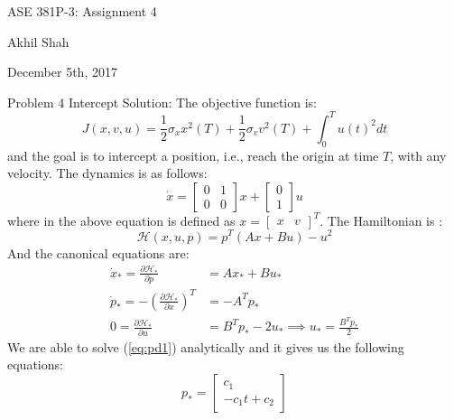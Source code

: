 \documentclass{article}
\begin{document}
\begin{center}
	{\huge ASE 381P-3: Assignment 4}
\end{center}
\begin{center}
	Akhil Shah
\end{center}
\begin{center}
	December 5th, 2017
\end{center}

\noindent
{\large Problem 4}
\newline
\newline
\noindent
Intercept Solution:
\newline
The objective function is:
\begin{equation*}
	J(x, v, u) = \frac{1}{2}\sigma_x x^2(T) + \frac{1}{2}\sigma_v v^2(T) + \int_0^T{u(t)^2 dt}
\end{equation*}
and the goal is to intercept a position, i.e., reach the origin at time $T$, with any velocity.  \newline
The dynamics is as follows:
\begin{equation*}
	\dot{x} = \begin{bmatrix} 0 & 1 \\ 0 & 0  \end{bmatrix} x + \begin{bmatrix} 0 \\ 1 \end{bmatrix}u 
\end{equation*}
where in the above equation is defined as $ x = \begin{bmatrix} x & v \end{bmatrix}^T $. \newline
The Hamiltonian is :
\begin{equation*}
	\mathcal{H}(x, u, p) = p^T(Ax + Bu) - u^2
\end{equation*}
And the canonical equations are:
\begin{align}
	\dot{x}_* = \frac{\partial \mathcal{H}_*}{\partial p} &= Ax_* + Bu_* \label{eq:dyn1} \\ 
	\dot{p}_* = -\left(\frac{\partial \mathcal{H}_*}{\partial x}\right)^T &= - A^Tp_* \label{eq:pd1} \\
	0 = \frac{\partial \mathcal{H}_*}{\partial u} &= B^Tp_* - 2u_* \implies u_* = \frac{B^Tp_*}{2} \label{eq:u1}
\end{align}
We are able to solve (\ref{eq:pd1}) analytically and it gives us the following equations:
\begin{equation}
	p_* = \begin{bmatrix} c_1 \\ -c_1 t + c_2 \end{bmatrix} \label{eq:pa1}
\end{equation}
\end{document}
